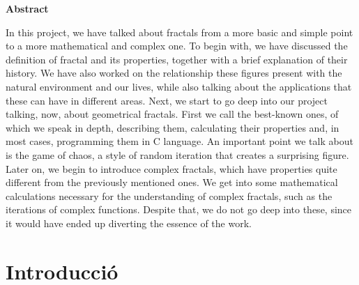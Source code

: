 \documentclass[12pt]{report}
\begin{document}
 \centerline{\textbf{Abstract}}
    In this project, we have talked about fractals from a more basic and simple point to a more mathematical and complex one. To begin with, we have discussed the definition of fractal and its properties, together with a brief explanation of their history. We have also worked on the relationship these figures present with the natural environment and our lives, while also talking about the applications that these can have in different areas. Next, we start to go deep into our project talking, now, about geometrical fractals. First we call the best-known ones, of which we speak in depth, describing them, calculating their properties and, in most cases, programming them in C language. An important point we talk about is the game of chaos, a style of random iteration that creates a surprising figure. Later on, we begin to introduce complex fractals, which have properties quite different from the previously mentioned ones. We get into some mathematical calculations necessary for the understanding of complex fractals, such as the iterations of complex functions. Despite that, we do not go deep into these, since it would have ended up diverting the essence of the work. 

\newpage
\chapter{Introducció}
\setcounter{page}{6 }
\end{document}
